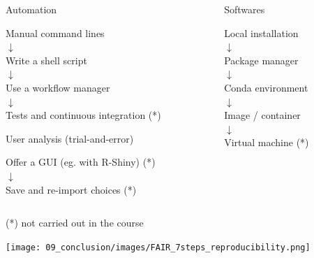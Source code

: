 \begin{frame}{\FAIRB}

\begin{columns}
\begin{column}{.55\textwidth}
\begin{block}{Automation}
\begin{center}
    Manual command lines\\
    $\downarrow$\\
    Write a shell script\\
    $\downarrow$\\
    Use a workflow manager\\
    $\downarrow$\\
    Tests and continuous integration (*)
\end{center}
\end{block}
\begin{block}{User analysis (trial-and-error)}
\begin{center}
    Offer a GUI (eg. with R-Shiny) (*)\\
    $\downarrow$\\
    Save and re-import choices (*)
\end{center}
\end{block}
\end{column}
\begin{column}{.35\textwidth}
\begin{block}{Softwares}
\begin{center}
Local installation\\
$\downarrow$\\
Package manager\\
$\downarrow$\\
Conda environment\\
$\downarrow$\\
Image / container\\
$\downarrow$\\
Virtual machine (*)
\end{center}
\end{block}
\end{column}
\end{columns}
\begin{center}
    (*) not carried out in the course
\end{center}
\end{frame}
\begin{frame}{\FAIRB}

\begin{center}
    \texttt{[image: 09\_conclusion/images/FAIR\_7steps\_reproducibility.png]}
\end{center}

\end{frame}

